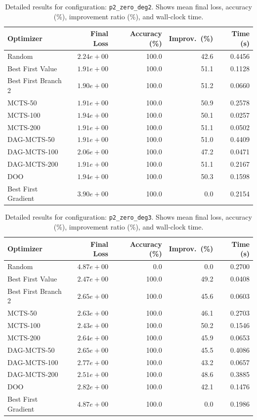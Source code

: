 \begin{table}[H]
\centering
\caption{Detailed results for configuration: \texttt{p2\_zero\_deg2}. Shows mean final loss, accuracy (\%), improvement ratio (\%), and wall-clock time.}
\label{tab:funclearn-detail-1}
\begin{tabular}{lrrrr}
\toprule
Optimizer & Final Loss & Accuracy (\%) & Improv.~(\%) & Time (s) \\
\midrule
Random & $2.24e+00$ & 100.0 & 42.6 & 0.4456 \\
\hline
Best First Value & $1.91e+00$ & 100.0 & 51.1 & 0.1128 \\
\hline
Best First Branch 2 & \textbf{$1.90e+00$} & 100.0 & 51.2 & 0.0660 \\
\hline
MCTS-50 & $1.91e+00$ & 100.0 & 50.9 & 0.2578 \\
\hline
MCTS-100 & $1.94e+00$ & 100.0 & 50.1 & 0.0257 \\
\hline
MCTS-200 & $1.91e+00$ & 100.0 & 51.1 & 0.0502 \\
\hline
DAG-MCTS-50 & $1.91e+00$ & 100.0 & 51.0 & 0.4409 \\
\hline
DAG-MCTS-100 & $2.06e+00$ & 100.0 & 47.2 & 0.0471 \\
\hline
DAG-MCTS-200 & $1.91e+00$ & 100.0 & 51.1 & 0.2167 \\
\hline
DOO & $1.94e+00$ & 100.0 & 50.3 & 0.1598 \\
\hline
Best First Gradient & $3.90e+00$ & 100.0 & 0.0 & 0.2154 \\
\bottomrule
\end{tabular}
\end{table}

\begin{table}[H]
\centering
\caption{Detailed results for configuration: \texttt{p2\_zero\_deg3}. Shows mean final loss, accuracy (\%), improvement ratio (\%), and wall-clock time.}
\label{tab:funclearn-detail-2}
\begin{tabular}{lrrrr}
\toprule
Optimizer & Final Loss & Accuracy (\%) & Improv.~(\%) & Time (s) \\
\midrule
Random & $4.87e+00$ & 0.0 & 0.0 & 0.2700 \\
\hline
Best First Value & $2.47e+00$ & 100.0 & 49.2 & 0.0408 \\
\hline
Best First Branch 2 & $2.65e+00$ & 100.0 & 45.6 & 0.0603 \\
\hline
MCTS-50 & $2.63e+00$ & 100.0 & 46.1 & 0.2703 \\
\hline
MCTS-100 & \textbf{$2.43e+00$} & 100.0 & 50.2 & 0.1546 \\
\hline
MCTS-200 & $2.64e+00$ & 100.0 & 45.9 & 0.0653 \\
\hline
DAG-MCTS-50 & $2.65e+00$ & 100.0 & 45.5 & 0.4086 \\
\hline
DAG-MCTS-100 & $2.77e+00$ & 100.0 & 43.2 & 0.0657 \\
\hline
DAG-MCTS-200 & $2.51e+00$ & 100.0 & 48.6 & 0.3885 \\
\hline
DOO & $2.82e+00$ & 100.0 & 42.1 & 0.1476 \\
\hline
Best First Gradient & $4.87e+00$ & 100.0 & 0.0 & 0.1986 \\
\bottomrule
\end{tabular}
\end{table}

